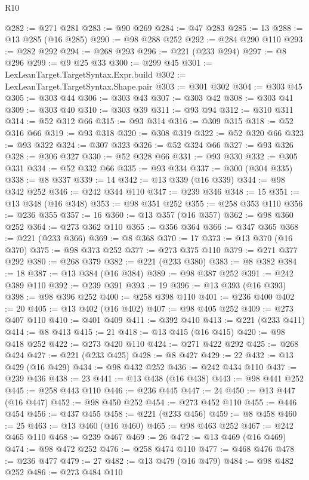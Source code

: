 \begin{lexlean}{R10}
\begin{coremodule}
@282 := @271 @281
@283 := @90 @269
@284 := @47 @283
@285 := 13
@288 := @13 @285 (@16 @285)
@290 := @98 @288 @252
@292 := @284 @290 @110
@293 := @282 @292
@294 := @268 @293
@296 := @221 (@233 @294)
@297 := @8 @296
@299 := @9 @25 @33
@300 := @299 @45
@301 := LexLeanTarget.TargetSyntax.Expr.build
@302 := LexLeanTarget.TargetSyntax.Shape.pair
@303 := @301 @302
@304 := @303 @45
@305 := @303 @44
@306 := @303 @43
@307 := @303 @42
@308 := @303 @41
@309 := @303 @40
@310 := @303 @39
@311 := @93 @94
@312 := @310 @311
@314 := @52 @312 @66
@315 := @93 @314
@316 := @309 @315
@318 := @52 @316 @66
@319 := @93 @318
@320 := @308 @319
@322 := @52 @320 @66
@323 := @93 @322
@324 := @307 @323
@326 := @52 @324 @66
@327 := @93 @326
@328 := @306 @327
@330 := @52 @328 @66
@331 := @93 @330
@332 := @305 @331
@334 := @52 @332 @66
@335 := @93 @334
@337 := @300 (@304 @335)
@338 := @8 @337
@339 := 14
@342 := @13 @339 (@16 @339)
@344 := @98 @342 @252
@346 := @242 @344 @110
@347 := @239 @346
@348 := 15
@351 := @13 @348 (@16 @348)
@353 := @98 @351 @252
@355 := @258 @353 @110
@356 := @236 @355
@357 := 16
@360 := @13 @357 (@16 @357)
@362 := @98 @360 @252
@364 := @273 @362 @110
@365 := @356 @364
@366 := @347 @365
@368 := @221 (@233 @366)
@369 := @8 @368
@370 := 17
@373 := @13 @370 (@16 @370)
@375 := @98 @373 @252
@377 := @273 @375 @110
@379 := @271 @377 @292
@380 := @268 @379
@382 := @221 (@233 @380)
@383 := @8 @382
@384 := 18
@387 := @13 @384 (@16 @384)
@389 := @98 @387 @252
@391 := @242 @389 @110
@392 := @239 @391
@393 := 19
@396 := @13 @393 (@16 @393)
@398 := @98 @396 @252
@400 := @258 @398 @110
@401 := @236 @400
@402 := 20
@405 := @13 @402 (@16 @402)
@407 := @98 @405 @252
@409 := @273 @407 @110
@410 := @401 @409
@411 := @392 @410
@413 := @221 (@233 @411)
@414 := @8 @413
@415 := 21
@418 := @13 @415 (@16 @415)
@420 := @98 @418 @252
@422 := @273 @420 @110
@424 := @271 @422 @292
@425 := @268 @424
@427 := @221 (@233 @425)
@428 := @8 @427
@429 := 22
@432 := @13 @429 (@16 @429)
@434 := @98 @432 @252
@436 := @242 @434 @110
@437 := @239 @436
@438 := 23
@441 := @13 @438 (@16 @438)
@443 := @98 @441 @252
@445 := @258 @443 @110
@446 := @236 @445
@447 := 24
@450 := @13 @447 (@16 @447)
@452 := @98 @450 @252
@454 := @273 @452 @110
@455 := @446 @454
@456 := @437 @455
@458 := @221 (@233 @456)
@459 := @8 @458
@460 := 25
@463 := @13 @460 (@16 @460)
@465 := @98 @463 @252
@467 := @242 @465 @110
@468 := @239 @467
@469 := 26
@472 := @13 @469 (@16 @469)
@474 := @98 @472 @252
@476 := @258 @474 @110
@477 := @468 @476
@478 := @236 @477
@479 := 27
@482 := @13 @479 (@16 @479)
@484 := @98 @482 @252
@486 := @273 @484 @110

\end{coremodule}
\end{lexlean}
